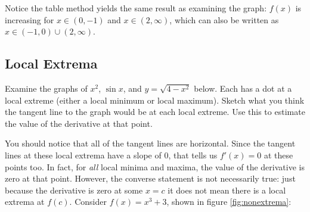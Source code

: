 Notice the table method yields the same result as examining the graph: $f(x)$ is increasing for $x\in (0, -1)$ and $x \in (2, \infty)$, which can also be written as $x \in (-1, 0) \cup (2, \infty)$. 

\subsection{Local Extrema}
Examine the graphs of $x^2$, $\sin{x}$, and $y=\sqrt{4-x^2}$ below. Each has a dot at a local extreme (either a local minimum or local maximum). Sketch what you think the tangent line to the graph would be at each local extreme. Use this to estimate the value of the derivative at that point. 




You should notice that all of the tangent lines are horizontal. Since the tangent lines at these local extrema have a slope of $0$, that tells us $f'(x)=0$ at these points too. In fact, for \textit{all} local minima and maxima, the value of the derivative is zero at that point. However, the converse statement is not necessarily true: just because the derivative is zero at some $x=c$ it does not mean there is a local extrema at $f(c)$. Consider $f(x) = x^3+3$, shown in figure  \ref{fig:nonextrema}:


